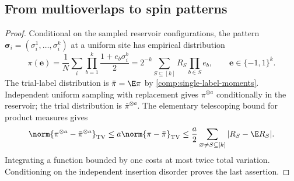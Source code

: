 \subsection{From multioverlaps to spin patterns}


\begin{proof}
Conditional on the sampled reservoir configurations, the pattern
$\boldsymbol\sigma_i=(\sigma_i^1,\ldots,\sigma_i^k)$ at a uniform site
has empirical distribution
\[
 \pi(\boldsymbol e)=\frac1N\sum_i
 \prod_{b=1}^k\frac{1+e_b\sigma_i^b}{2}
 =2^{-k}\sum_{S\subseteq[k]}R_S\prod_{b\in S}e_b,
 \qquad \boldsymbol e\in\{-1,1\}^k.
\]
The trial-label distribution is $\bar\pi=\E\pi$ by
\eqref{comp:single-label-moments}. Independent uniform sampling with
replacement gives $\pi^{\otimes a}$ conditionally in the reservoir; the
trial distribution is $\bar\pi^{\otimes a}$. The elementary telescoping
bound for product measures gives
\[
 \norm{\pi^{\otimes a}-\bar\pi^{\otimes a}}_{\rm TV}
 \le a\norm{\pi-\bar\pi}_{\rm TV}
 \le\frac a2\sum_{\varnothing\ne S\subseteq[k]}|R_S-\E R_S|.
\]
Integrating a function bounded by one costs at most twice total variation.
Conditioning on the independent insertion disorder proves the last assertion.
\end{proof}


